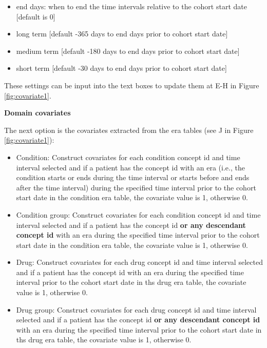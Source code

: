 \documentclass[11pt]{book}
\providecommand{\tightlist}{%
  \setlength{\itemsep}{0pt}\setlength{\parskip}{0pt}}
\theoremstyle{definition}
\theoremstyle{definition}
\theoremstyle{definition}
\theoremstyle{remark}
\begin{document}
\begin{itemize}
\tightlist
\item
  end days: when to end the time intervals relative to the cohort start date {[}default is 0{]}
\item
  long term {[}default -365 days to end days prior to cohort start date{]}
\item
  medium term {[}default -180 days to end days prior to cohort start date{]}
\item
  short term {[}default -30 days to end days prior to cohort start date{]}
\end{itemize}

These settings can be input into the text boxes to update them at E-H in Figure \ref{fig:covariate1}.

\textbf{Domain covariates}

The next option is the covariates extracted from the era tables (see J in Figure \ref{fig:covariate1}):

\begin{itemize}
\tightlist
\item
  Condition: Construct covariates for each condition concept id and time interval selected and if a patient has the concept id with an era (i.e., the condition starts or ends during the time interval or starts before and ends after the time interval) during the specified time interval prior to the cohort start date in the condition era table, the covariate value is 1, otherwise 0.
\item
  Condition group: Construct covariates for each condition concept id and time interval selected and if a patient has the concept id \textbf{or any descendant concept id} with an era during the specified time interval prior to the cohort start date in the condition era table, the covariate value is 1, otherwise 0.
\item
  Drug: Construct covariates for each drug concept id and time interval selected and if a patient has the concept id with an era during the specified time interval prior to the cohort start date in ths drug era table, the covariate value is 1, otherwise 0.
\item
  Drug group: Construct covariates for each drug concept id and time interval selected and if a patient has the concept id \textbf{or any descendant concept id} with an era during the specified time interval prior to the cohort start date in ths drug era table, the covariate value is 1, otherwise 0.
\end{itemize}
\end{document}
